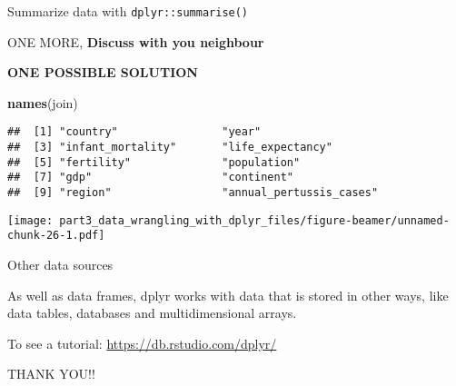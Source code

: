 \documentclass[ignorenonframetext,]{beamer}
\newenvironment{Shaded}{\begin{snugshade}}{\end{snugshade}}
\newcommand{\DataTypeTok}[1]{\textcolor[rgb]{0.13,0.29,0.53}{#1}}
\newcommand{\KeywordTok}[1]{\textcolor[rgb]{0.13,0.29,0.53}{\textbf{#1}}}
\newcommand{\NormalTok}[1]{#1}
\newcommand{\OperatorTok}[1]{\textcolor[rgb]{0.81,0.36,0.00}{\textbf{#1}}}
\newcommand{\StringTok}[1]{\textcolor[rgb]{0.31,0.60,0.02}{#1}}
\begin{document}
\begin{frame}[fragile]{Summarize data with \texttt{dplyr::summarise()}}
\begin{block}{ONE MORE, \textbf{Discuss with you neighbour}}
\end{block}

\begin{block}{\textbf{ONE POSSIBLE SOLUTION}}

\begin{Shaded}
\begin{Highlighting}[]
\KeywordTok{names}\NormalTok{(join)}
\end{Highlighting}
\end{Shaded}

\begin{verbatim}
##  [1] "country"                "year"                  
##  [3] "infant_mortality"       "life_expectancy"       
##  [5] "fertility"              "population"            
##  [7] "gdp"                    "continent"             
##  [9] "region"                 "annual_pertussis_cases"
\end{verbatim}

\begin{Shaded}
\end{Shaded}

\texttt{[image: part3\_data\_wrangling\_with\_dplyr\_files/figure-beamer/unnamed-chunk-26-1.pdf]}

\end{block}

\begin{block}{Other data sources}

As well as data frames, dplyr works with data that is stored in other
ways, like data tables, databases and multidimensional arrays.

To see a tutorial: \url{https://db.rstudio.com/dplyr/}

\end{block}

\end{frame}

\begin{frame}{THANK YOU!!}
\protect\hypertarget{thank-you}{}

\end{frame}
\end{document}
